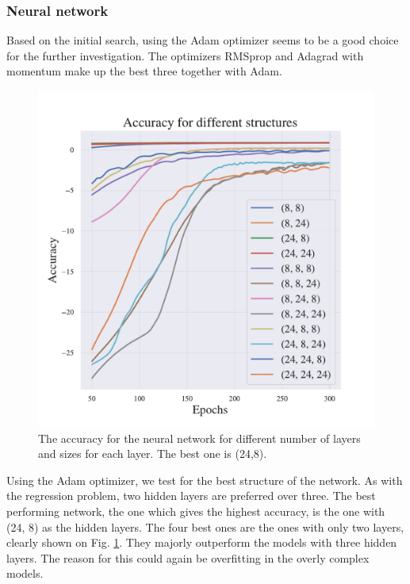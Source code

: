 \subsubsection{Neural network}

Based on the initial search, using the Adam optimizer seems to be a good choice for the further investigation. The optimizers RMSprop and Adagrad with momentum make up the best three together with Adam. 

\begin{figure}[h!]
    \centering
    \includegraphics[width=1.0\linewidth]{project_2/figures/Accuracy for different structures_classification.pdf}
    \caption{The accuracy for the neural network for different number of layers and sizes for each layer. The best one is (24,8).}
    \label{fig:structure_cancer}
\end{figure}

Using the Adam optimizer, we test for the best structure of the network. As with the regression problem, two hidden layers are preferred over three. 
The best performing network, the one which gives the highest accuracy, is the one with (24, 8) as the hidden layers. The four best ones are the ones with only two layers, clearly shown on Fig. \ref{fig:structure_cancer}. They majorly outperform the models with three hidden layers. 
The reason for this could again be overfitting in the overly complex models.

